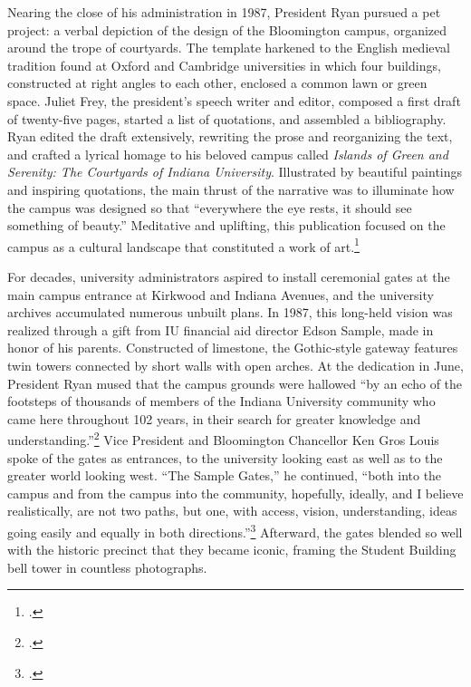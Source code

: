 \documentclass[
  american,
  letterpaper,
]{scrreprt}
\begin{document}
Nearing the close of his administration in 1987, President Ryan pursued
a pet project: a verbal depiction of the design of the Bloomington
campus, organized around the trope of courtyards. The template harkened
to the English medieval tradition found at Oxford and Cambridge
universities in which four buildings, constructed at right angles to
each other, enclosed a common lawn or green space. Juliet Frey, the
president's speech writer and editor, composed a first draft of
twenty-five pages, started a list of quotations, and assembled a
bibliography. Ryan edited the draft extensively, rewriting the prose and
reorganizing the text, and crafted a lyrical homage to his beloved
campus called \emph{Islands of Green and Serenity: The Courtyards of
Indiana University}. Illustrated by beautiful paintings and inspiring
quotations, the main thrust of the narrative was to illuminate how the
campus was designed so that ``everywhere the eye rests, it should see
something of beauty.'' Meditative and uplifting, this publication
focused on the campus as a cultural landscape that constituted a work of
art.\footnote{.}

For decades, university administrators aspired to install ceremonial
gates at the main campus entrance at Kirkwood and Indiana Avenues, and
the university archives accumulated numerous unbuilt plans. In 1987,
this long-held vision was realized through a gift from IU financial aid
director Edson Sample, made in honor of his parents. Constructed of
limestone, the Gothic-style gateway features twin towers connected by
short walls with open arches. At the dedication in June, President Ryan
mused that the campus grounds were hallowed ``by an echo of the
footsteps of thousands of members of the Indiana University community
who came here throughout 102 years, in their search for greater
knowledge and understanding.''\footnote{.} Vice President and
Bloomington Chancellor Ken Gros Louis spoke of the gates as entrances,
to the university looking east as well as to the greater world looking
west. ``The Sample Gates,'' he continued, ``both into the campus and
from the campus into the community, hopefully, ideally, and I believe
realistically, are not two paths, but one, with access, vision,
understanding, ideas going easily and equally in both
directions.''\footnote{.}
Afterward, the gates blended so well with the historic precinct that
they became iconic, framing the Student Building bell tower in countless
photographs.
\end{document}
